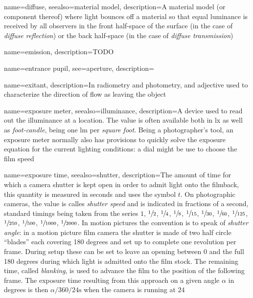 {
	name={diffuse},
	seealso={material model},
	description={A material model (or component thereof) where light bounces off a material
		so that equal luminance is received by all observers in the front half-space of the
		surface (in the case of \textsl{diffuse reflection}) or the back half-space (in the
		case of \textsl{diffuse transmission})}
}

{
	name={emission},
	description={TODO}
}

{
	name={entrance pupil},
	see={aperture},
	description=\nopostdesc
}

{
	name={exitant},
	description={In radiometry and photometry, and adjective used to characterize the direction of
		flow as leaving the object}
}

{
	name={exposure meter},
	seealso={illuminance},
	description={A device used to read out the illuminance at a location. The value is often
		available both in \unit{\lux} as well as \textsl{foot-candle}, being one \unit{\lumen}
		per \textsl{square foot}. Being a photographer's tool, an exposure meter normally also
		has provisions to quickly solve the exposure equation for the current lighting
		conditions: a dial might be use to choose the film speed }
}

{
	name={exposure time},
	seealso={shutter},
	description={The amount of time for which a camera shutter is kept open in order to
		admit light onto the filmback, this quantity is measured in seconds and uses the
		symbol $t$. 
		On photographic cameras, the value is calles \textsl{shutter speed} and is 
		indicated in fractions of a second, standard timings being
		taken from the series $1$, $\sfrac12$, $\sfrac14$, $\sfrac18$, 
		$\sfrac1{15}$, $\sfrac1{30}$, $\sfrac1{60}$, $\sfrac1{125}$, 
		$\sfrac1{250}$, $\sfrac1{500}$, $\sfrac1{1000}$, $\sfrac1{2000}$.
		In motion pictures the convention is to speak of \textsl{shutter angle}:
		in a motion picture film camera the shutter is made of two half circle ``blades'' 
		each covering 180 degrees and set up to complete one revolution per frame. 
		During setup these can be set to leave an opening between 0 and the
		full 180 degrees during which light is admitted onto the film stock.
		The remaining time, called \textsl{blanking}, is used to advance the film
		to the position of the following frame. The exposure time resulting from this 
		approach on a given angle $\alpha$ in degrees is then $\alpha/360/24 \unit{\second}$
		when the camera is running at $24$ }
}


